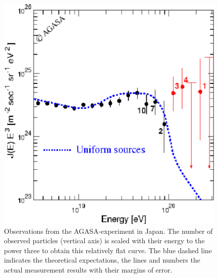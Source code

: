 \documentclass[12pt,a4paper]{article}
\numberwithin{equation}{section}
\numberwithin{figure}{section}
\numberwithin{table}{section}
\begin{document}
\begin{figure}\begin{center}
\includegraphics[scale=0.4]{spectrum_zoom.eps}
\caption{Observations from the AGASA-experiment in Japan. The number of observed particles (vertical axis) is scaled with their energy to the power three to obtain this relatively flat curve. The blue dashed line indicates the theoretical expectations, the lines and numbers the actual measurement results with their margins of error.}\label{fig:spectrum_zoom}
\end{center}\end{figure}
\end{document}
